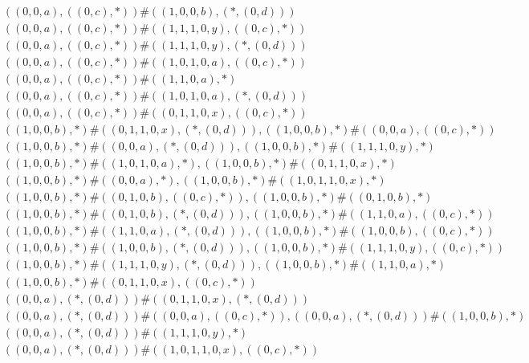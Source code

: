 \begin{align*}
	 & \qquad ((0, 0, a), ((0, c), *)) \# ((1, 0, 0, b), (*, (0, d))) \\ 
	 & \qquad ((0, 0, a), ((0, c), *)) \# ((1, 1, 1, 0, y), ((0, c), *)) \\ 
	 & \qquad ((0, 0, a), ((0, c), *)) \# ((1, 1, 1, 0, y), (*, (0, d))) \\ 
	 & \qquad ((0, 0, a), ((0, c), *)) \# ((1, 0, 1, 0, a), ((0, c), *)) \\ 
	 & \qquad ((0, 0, a), ((0, c), *)) \# ((1, 1, 0, a), *) \\ 
	 & \qquad ((0, 0, a), ((0, c), *)) \# ((1, 0, 1, 0, a), (*, (0, d))) \\ 
	 & \qquad ((0, 0, a), ((0, c), *)) \# ((0, 1, 1, 0, x), ((0, c), *)) \\ 
	 & \qquad ((1, 0, 0, b), *) \# ((0, 1, 1, 0, x), (*, (0, d))), ((1, 0, 0, b), *) \# ((0, 0, a), ((0, c), *)) \\ 
	 & \qquad ((1, 0, 0, b), *) \# ((0, 0, a), (*, (0, d))), ((1, 0, 0, b), *) \# ((1, 1, 1, 0, y), *) \\ 
	 & \qquad ((1, 0, 0, b), *) \# ((1, 0, 1, 0, a), *), ((1, 0, 0, b), *) \# ((0, 1, 1, 0, x), *) \\ 
	 & \qquad ((1, 0, 0, b), *) \# ((0, 0, a), *), ((1, 0, 0, b), *) \# ((1, 0, 1, 1, 0, x), *) \\ 
	 & \qquad ((1, 0, 0, b), *) \# ((0, 1, 0, b), ((0, c), *)), ((1, 0, 0, b), *) \# ((0, 1, 0, b), *) \\ 
	 & \qquad ((1, 0, 0, b), *) \# ((0, 1, 0, b), (*, (0, d))), ((1, 0, 0, b), *) \# ((1, 1, 0, a), ((0, c), *)) \\ 
	 & \qquad ((1, 0, 0, b), *) \# ((1, 1, 0, a), (*, (0, d))), ((1, 0, 0, b), *) \# ((1, 0, 0, b), ((0, c), *)) \\ 
	 & \qquad ((1, 0, 0, b), *) \# ((1, 0, 0, b), (*, (0, d))), ((1, 0, 0, b), *) \# ((1, 1, 1, 0, y), ((0, c), *)) \\ 
	 & \qquad ((1, 0, 0, b), *) \# ((1, 1, 1, 0, y), (*, (0, d))), ((1, 0, 0, b), *) \# ((1, 1, 0, a), *) \\ 
	 & \qquad ((1, 0, 0, b), *) \# ((0, 1, 1, 0, x), ((0, c), *)) \\ 
	 & \qquad ((0, 0, a), (*, (0, d))) \# ((0, 1, 1, 0, x), (*, (0, d))) \\ 
	 & \qquad ((0, 0, a), (*, (0, d))) \# ((0, 0, a), ((0, c), *)), ((0, 0, a), (*, (0, d))) \# ((1, 0, 0, b), *) \\ 
	 & \qquad ((0, 0, a), (*, (0, d))) \# ((1, 1, 1, 0, y), *) \\ 
	 & \qquad ((0, 0, a), (*, (0, d))) \# ((1, 0, 1, 1, 0, x), ((0, c), *)) \\ 

\end{align*}

